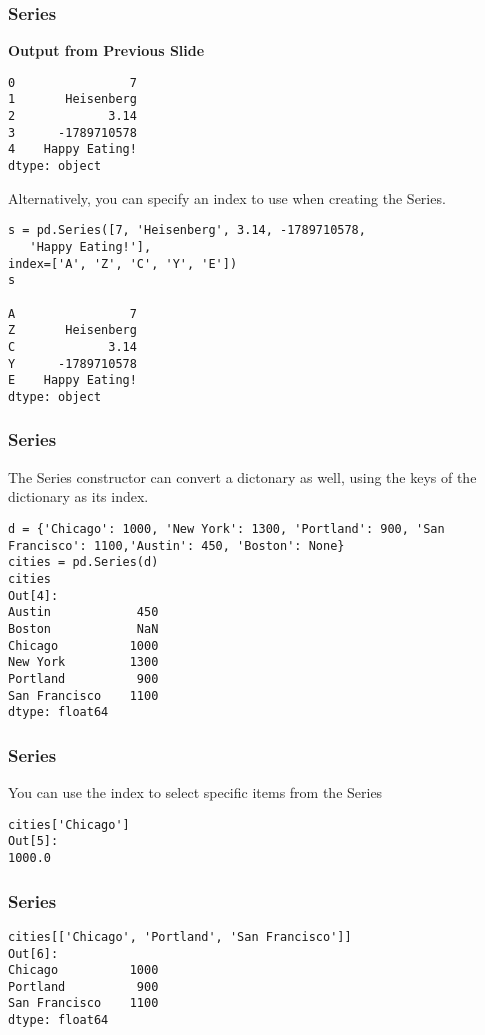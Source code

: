 \begin{frame}[fragile]\frametitle{Series}
\textbf{Output from Previous Slide}
\begin{lstlisting}
0                7
1       Heisenberg
2             3.14
3      -1789710578
4    Happy Eating!
dtype: object
\end{lstlisting}
\end{frame}

\begin{frame}[fragile]
Alternatively, you can specify an index to use when creating the Series.
\begin{lstlisting}
s = pd.Series([7, 'Heisenberg', 3.14, -1789710578, 
   'Happy Eating!'],
index=['A', 'Z', 'C', 'Y', 'E'])
s

A                7
Z       Heisenberg
C             3.14
Y      -1789710578
E    Happy Eating!
dtype: object
\end{lstlisting}
\end{frame}

\begin{frame}[fragile]\frametitle{Series}		
The Series constructor can convert a dictonary as well, using the keys of the dictionary as its index.
\begin{lstlisting}
d = {'Chicago': 1000, 'New York': 1300, 'Portland': 900, 'San Francisco': 1100,'Austin': 450, 'Boston': None}
cities = pd.Series(d)
cities
Out[4]:
Austin            450
Boston            NaN
Chicago          1000
New York         1300
Portland          900
San Francisco    1100
dtype: float64
\end{lstlisting}
\end{frame}

\begin{frame}[fragile]\frametitle{Series}		
You can use the index to select specific items from the Series 
\begin{lstlisting}
cities['Chicago']
Out[5]:
1000.0
\end{lstlisting}
\end{frame}

\begin{frame}[fragile]\frametitle{Series}		
\begin{lstlisting}
cities[['Chicago', 'Portland', 'San Francisco']]
Out[6]:
Chicago          1000
Portland          900
San Francisco    1100
dtype: float64
\end{lstlisting}
\end{frame}

